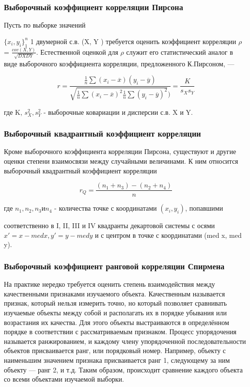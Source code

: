 \documentclass[a4]{article}
\begin{document}
				\subsubsection{Выборочный коэффициент корреляции Пирсона}
					
Пусть по выборке значений 
					

					
$\{{x_i, y_i}\}^n_1$ 1 двумерной с.в. (X, Y ) требуется оценить коэффициент корреляции $\rho$ = $\frac{cov(X, Y)}{\sqrt{DX DY}}$. Естественной оценкой для $\rho$ служит его статистический аналог в виде выборочного коэффициента корреляции, предложенного К.Пирсоном, —
					

					
$$r = \frac{\frac{1}{n} \sum(x_i - \overline{x})(y_i - \overline{y})}{\sqrt{\frac{1}{n} \sum (x_i - \overline{x})^2 \frac{1}{n} \sum(y_i - \overline{y})^2})} = \frac{K}{s_X s_Y}$$
					
где K, $s^2_X, s^2_Y$ - выборочные ковариации и дисперсии с.в. X и Y.
					

					
\subsubsection{Выборочный квадрантный коэффициент корреляции}
					
	Кроме выборочного коэффициента корреляции Пирсона, существуют и другие оценки степени взаимосвязи между случайными величинами. К ним относится выборочный квадрантный коэффициент корреляции
					
	$$r_Q = \frac{(n_1 + n_3) - (n_2 + n_4)}{n}$$
					
	
					
	где $n_1, n_2, n_3 и n_4$ - количества точке с координатами $(x_i, y_i)$, попавшими
					
	соответственно в I, II, III и IV квадранты декартовой системы с осями $x' = x - med x, y' = y - med y$ и с центром в точке с координатами (med x, med y).
					
					\subsubsection{Выборочный коэффициент ранговой корреляции Спирмена}
						На практике нередко требуется оценить степень взаимодействия между качественными признаками изучаемого объекта. Качественным называется признак, который нельзя измерить точно, но который позволяет сравнивать изучаемые объекты между собой и располагать их в порядке убывания или возрастания их качества. Для этого объекты выстраиваются в определённом порядке в соответствии с рассматриваемым признаком. Процесс упорядочения называется ранжированием, и каждому члену упорядоченной последовательности объектов присваивается ранг, или порядковый номер. Например, объекту с наименьшим значением признака присваивается ранг 1, следующему за ним объекту — ранг 2, и т.д. Таким образом, происходит сравнение каждого объекта со всеми объектами изучаемой выборки.\\
						
\end{document}
